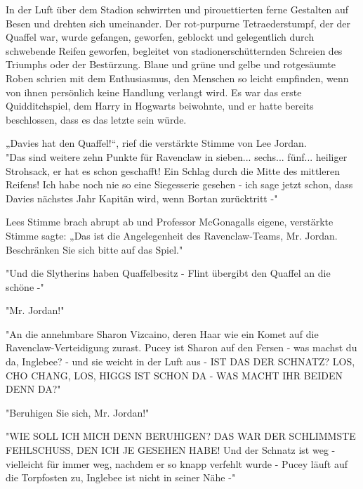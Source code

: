 {In der Luft über dem Stadion schwirrten und pirouettierten ferne Gestalten auf Besen und drehten sich umeinander. Der rot-purpurne Tetraederstumpf, der der Quaffel war, wurde gefangen, geworfen, geblockt und gelegentlich durch schwebende Reifen geworfen, begleitet von stadionerschütternden Schreien des Triumphs oder der Bestürzung. Blaue und grüne und gelbe und rotgesäumte Roben schrien mit dem Enthusiasmus, den Menschen so leicht empfinden, wenn von ihnen persönlich keine Handlung verlangt wird. Es war das erste Quidditchspiel, dem Harry in Hogwarts beiwohnte, und er hatte bereits beschlossen, dass es das letzte sein würde.

„Davies hat den Quaffel!“, rief die verstärkte Stimme von Lee Jordan.\\ "Das sind weitere zehn Punkte für Ravenclaw in sieben... sechs... fünf... heiliger Strohsack, er hat es schon geschafft! Ein Schlag durch die Mitte des mittleren Reifens! Ich habe noch nie so eine Siegesserie gesehen - ich sage jetzt schon, dass Davies nächstes Jahr Kapitän wird, wenn Bortan zurücktritt -"

Lees Stimme brach abrupt ab und Professor McGonagalls eigene, verstärkte Stimme sagte: „Das ist die Angelegenheit des Ravenclaw-Teams, Mr. Jordan. Beschränken Sie sich bitte auf das Spiel."

"Und die Slytherins haben Quaffelbesitz - Flint übergibt den Quaffel an die schöne -"

"Mr. Jordan!"

"An die annehmbare Sharon Vizcaino, deren Haar wie ein Komet auf die Ravenclaw-Verteidigung zurast. Pucey ist Sharon auf den Fersen - was machst du da, Inglebee? - und sie weicht in der Luft aus - IST DAS DER SCHNATZ? LOS, CHO CHANG, LOS, HIGGS IST SCHON DA - WAS MACHT IHR BEIDEN DENN DA?"

"Beruhigen Sie sich, Mr. Jordan!"

"WIE SOLL ICH MICH DENN BERUHIGEN? DAS WAR DER SCHLIMMSTE FEHLSCHUSS, DEN ICH JE GESEHEN HABE! Und der Schnatz ist weg - vielleicht für immer weg, nachdem er so knapp verfehlt wurde - Pucey läuft auf die Torpfosten zu, Inglebee ist nicht in seiner Nähe -"

}
